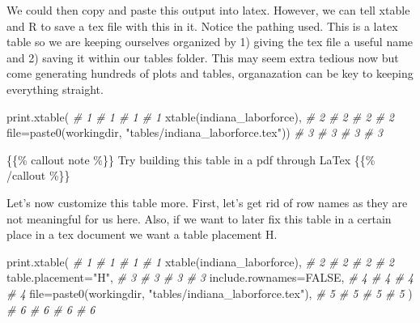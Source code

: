 \documentclass[
]{book}
\newenvironment{Shaded}{\begin{snugshade}}{\end{snugshade}}
\newcommand{\AttributeTok}[1]{\textcolor[rgb]{0.77,0.63,0.00}{#1}}
\newcommand{\CommentTok}[1]{\textcolor[rgb]{0.56,0.35,0.01}{\textit{#1}}}
\newcommand{\ConstantTok}[1]{\textcolor[rgb]{0.00,0.00,0.00}{#1}}
\newcommand{\FunctionTok}[1]{\textcolor[rgb]{0.00,0.00,0.00}{#1}}
\newcommand{\NormalTok}[1]{#1}
\newcommand{\StringTok}[1]{\textcolor[rgb]{0.31,0.60,0.02}{#1}}
\begin{document}
We could then copy and paste this output into latex. However, we can tell xtable and R to save a tex file with this in it. Notice the pathing used. This is a latex table so we are keeping ourselves organized by 1) giving the tex file a useful name and 2) saving it within our tables folder. This may seem extra tedious now but come generating hundreds of plots and tables, organazation can be key to keeping everything straight.

\begin{Shaded}
\begin{Highlighting}[]
  \FunctionTok{print.xtable}\NormalTok{(                                                }\CommentTok{\# 1  \# 1  \# 1  \# 1}
    \FunctionTok{xtable}\NormalTok{(indiana\_laborforce),                                }\CommentTok{\# 2  \# 2  \# 2  \# 2}
    \AttributeTok{file=}\FunctionTok{paste0}\NormalTok{(workingdir, }\StringTok{"tables/indiana\_laborforce.tex"}\NormalTok{))  }\CommentTok{\# 3  \# 3  \# 3  \# 3}
\end{Highlighting}
\end{Shaded}

\{\{\% callout note \%\}\}
Try building this table in a pdf through LaTex
\{\{\% /callout \%\}\}

Let's now customize this table more. First, let's get rid of row names as they are not meaningful for us here. Also, if we want to later fix this table in a certain place in a tex document we want a table placement H.

\begin{Shaded}
\begin{Highlighting}[]
\FunctionTok{print.xtable}\NormalTok{(                                                 }\CommentTok{\# 1  \# 1  \# 1  \# 1}
  \FunctionTok{xtable}\NormalTok{(indiana\_laborforce),                                 }\CommentTok{\# 2  \# 2  \# 2  \# 2}
  \AttributeTok{table.placement=}\StringTok{"H"}\NormalTok{,                                        }\CommentTok{\# 3  \# 3  \# 3  \# 3}
  \AttributeTok{include.rownames=}\ConstantTok{FALSE}\NormalTok{,                                     }\CommentTok{\# 4  \# 4  \# 4  \# 4}
  \AttributeTok{file=}\FunctionTok{paste0}\NormalTok{(workingdir, }\StringTok{"tables/indiana\_laborforce.tex"}\NormalTok{),   }\CommentTok{\# 5  \# 5  \# 5  \# 5}
\NormalTok{  )                                                           }\CommentTok{\# 6  \# 6  \# 6  \# 6}
\end{Highlighting}
\end{Shaded}
\end{document}
